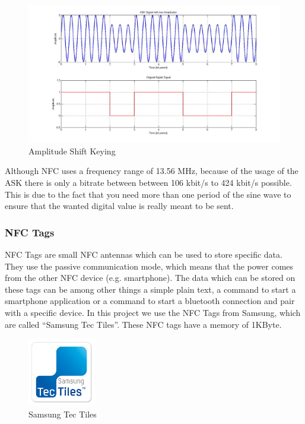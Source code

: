 \documentclass[11pt]{article}
\begin{document}
\begin{figure}[H]

 \centering
 \includegraphics [width=15cm]{ASK.png} %
 \caption{Amplitude Shift Keying\cite{cite5}}
\end{figure}

Although NFC uses a frequency range of 13.56 MHz, because of the usage of the ASK there is only a bitrate between between 106 kbit/s to 424 kbit/s possible. This is due to the fact that you need more than one period of the sine wave to ensure that the wanted digital value is really meant to be sent.\\


\subsubsection{NFC Tags}

NFC Tags are small NFC antennas which can be used to store specific data. They use the passive communication mode, which means that the power comes from the other NFC device (e.g. smartphone). The data which can be stored on these tags can be among other things a simple plain text, a command to start a smartphone application or a command to start a bluetooth connection and pair with a specific device. In this project we use the NFC Tags from Samsung, which are called "`Samsung Tec Tiles"'. These NFC tags have a memory of 1KByte.

\begin{figure}[H]

 \centering
 \includegraphics [width=3cm]{SamsungTecTiles.jpg} %
 \caption{Samsung Tec Tiles\cite{cite6}}
\end{figure}
\end{document}
